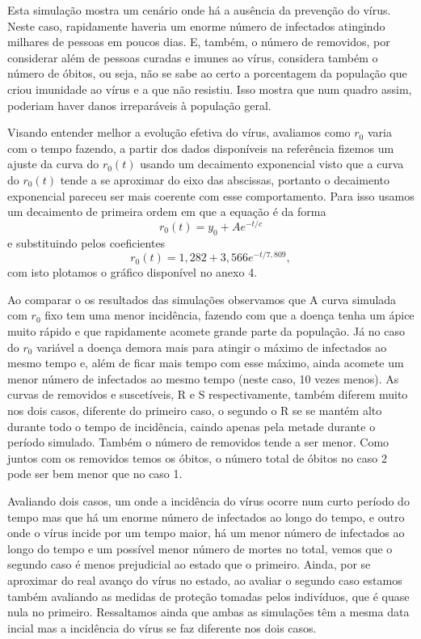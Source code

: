\documentclass[11pt, a4paper]{article}
\begin{document}
Esta simulação mostra um cenário onde há a ausência da prevenção do vírus.
Neste caso, rapidamente haveria um enorme número de infectados atingindo milhares de pessoas em poucos dias.
E, também, o número de removidos, por considerar além de pessoas curadas e imunes ao vírus, considera também o número de óbitos, ou seja, não se sabe ao certo a porcentagem da população que criou imunidade ao vírus e a que não resistiu.
Isso mostra que num quadro assim, poderiam haver danos irreparáveis à população geral.

Visando entender melhor a evolução efetiva do vírus, avaliamos como $r_0$ varia com o tempo fazendo, a partir dos dados disponíveis na referência \cite{model}
fizemos um ajuste da curva do $r_0(t)$
usando um decaimento exponencial visto que a curva do $r_0(t)$
tende a se aproximar do eixo das abscissas, portanto o decaimento exponencial pareceu ser mais coerente com esse comportamento.
Para isso usamos um decaimento de primeira ordem em que a equação é da forma
\[
	r_0(t) = y_0 + A e^{-t/c}
\]
e substituindo pelos coeficientes
\[
	r_0(t) = 1,282 + 3,566 e^{-t/7,809},
\]
com isto plotamos o gráfico disponível no anexo 4.

Ao comparar o os resultados das simulações observamos que A curva simulada com $r_0$
fixo tem uma menor incidência, fazendo com que a doença tenha um ápice muito rápido e que rapidamente acomete grande parte da população.
Já no caso do $r_0$ variável a doença demora mais para atingir o máximo de infectados ao mesmo tempo e, além de ficar mais tempo com esse máximo, ainda acomete um menor número de infectados ao mesmo tempo (neste caso, 10 vezes menos).
As curvas de removidos e suscetíveis, R e S respectivamente, também diferem muito nos dois casos, diferente do primeiro caso, o segundo o R se se mantém alto durante todo o tempo de incidência, caindo apenas pela metade durante o período simulado.
Também o número de removidos tende a ser menor.
Como juntos com os removidos temos os óbitos, o número total de óbitos no caso 2 pode ser bem menor que no caso 1.

Avaliando dois casos, um onde a incidência do vírus ocorre num curto período do tempo mas que há um enorme número de infectados ao longo do tempo, e outro onde o vírus incide por um tempo maior, há um menor número de infectados ao longo do tempo e um possível menor número de mortes no total, vemos que o segundo caso é menos prejudicial ao estado que o primeiro.
Ainda, por se aproximar do real avanço do vírus no estado, ao avaliar o segundo caso estamos também avaliando as medidas de proteção tomadas pelos indivíduos, que é quase nula no primeiro.
Ressaltamos ainda que ambas as simulações têm a mesma data incial mas a incidência do vírus se faz diferente nos dois casos.
\end{document}
